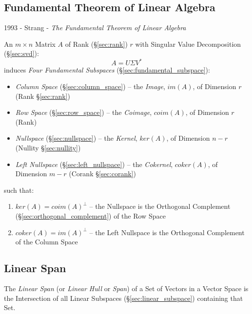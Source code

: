 \subsection{Fundamental Theorem of Linear Algebra}
\label{sec:fundamental_linear_algebra_theorem}

1993 - Strang - \emph{The Fundamental Theorem of Linear Algebra}

An $m \times n$ Matrix $A$ of Rank (\S\ref{sec:rank}) $r$ with Singular
Value Decomposition (\S\ref{sec:svd}):
\[
  A = U \Sigma V^*
\]
induces \emph{Four Fundamental Subspaces} (\S\ref{sec:fundamental_subspace}):
\begin{itemize}
  \item \emph{Column Space} (\S\ref{sec:column_space}) -- the \emph{Image},
    $im(A)$, of Dimension $r$ (Rank \S\ref{sec:rank})
  \item \emph{Row Space} (\S\ref{sec:row_space}) -- the \emph{Coimage},
    $coim(A)$, of Dimension $r$ (Rank)
  \item \emph{Nullspace} (\S\ref{sec:nullspace}) -- the \emph{Kernel},
    $ker(A)$, of Dimension $n - r$ (Nullity \S\ref{sec:nullity})
  \item \emph{Left Nullspace} (\S\ref{sec:left_nullspace}) -- the
    \emph{Cokernel}, $coker(A)$, of Dimension $m - r$ (Corank
    \S\ref{sec:corank})
\end{itemize}
such that:
\begin{enumerate}
  \item $ker(A) = coim(A)^\bot$ -- the Nullspace is the Orthogonal Complement
    (\S\ref{sec:orthogonal_complement}) of the Row Space
  \item $coker(A) = im(A)^\bot$ -- the Left Nullspace is the Orthogonal
    Complement of the Column Space
\end{enumerate}



\subsection{Linear Span}\label{sec:linear_span}

The \emph{Linear Span} (or \emph{Linear Hull} or \emph{Span}) of a Set of
Vectors in a Vector Space is the Intersection of all Linear Subspaces
(\S\ref{sec:linear_subspace}) containing that Set.

